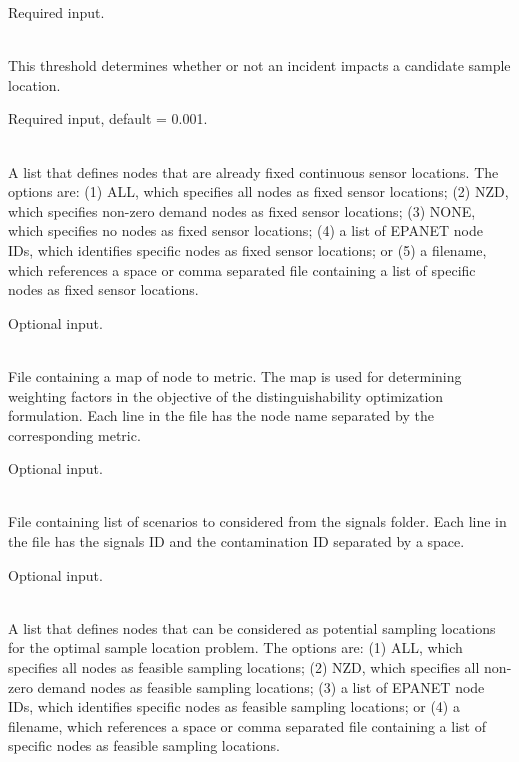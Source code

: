 \begin{description}[topsep=0pt,parsep=0.5em,itemsep=-0.4em]
\begin{description}[topsep=0pt,parsep=0.5em,itemsep=-0.4em]
                Required input.
    \item[{threshold}]\hfill
\\This threshold determines whether or not an incident impacts a candidate
                sample location.

                Required input, default = 0.001.
    \item[{fixed sensors}]\hfill
\\A list that defines nodes that are already fixed continuous sensor locations.
                The options are: (1) ALL, which specifies all nodes as fixed sensor locations;
                (2) NZD, which specifies non-zero demand nodes as fixed sensor locations;
                (3) NONE, which specifies no nodes as fixed sensor locations;
                (4) a list of EPANET node IDs, which identifies specific nodes as fixed sensor locations; or
                (5) a filename, which references a space or comma separated file containing a list of 
                specific nodes as fixed sensor locations. 

                Optional input.
    \item[{nodes metric}]\hfill
\\ File containing a map of node to metric. The map is used for determining weighting factors
                in the objective of the distinguishability optimization formulation.
                Each line in the file has the node name separated by the corresponding metric.  

                Optional input.
    \item[{list scenario ids}]\hfill
\\ File containing list of scenarios to considered from the signals folder.
                Each line in the file has the signals ID and the contamination ID separated by a space.
				
                Optional input.
    \item[{feasible nodes}]\hfill
\\A list that defines nodes that can be considered as potential sampling locations 
                for the optimal sample location problem.
                The options are: (1) ALL, which specifies all nodes as feasible sampling locations;
                (2) NZD, which specifies all non-zero demand nodes as feasible sampling locations;
                (3) a list of EPANET node IDs, which identifies specific nodes as feasible sampling locations; or
                (4) a filename, which references a space or comma separated file containing a list of 
                specific nodes as feasible sampling locations. 


\end{description}
\end{description}
